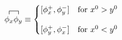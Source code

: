 \documentclass[margin=3pt]{standalone}
\begin{document}
\fontsize{14}{16}
$\displaystyle
\contraction[1ex]{}{\phi_x}{}{\phi_y}
\phi_x \phi_y
\equiv
\begin{cases}
    [\phi_x^+, \phi_y^-] & \text{for } x^0 > y^0
    \\[1em]
    [\phi_y^+, \phi_x^-] & \text{for } x^0 < y^0
\end{cases}
$
    
\end{document}
